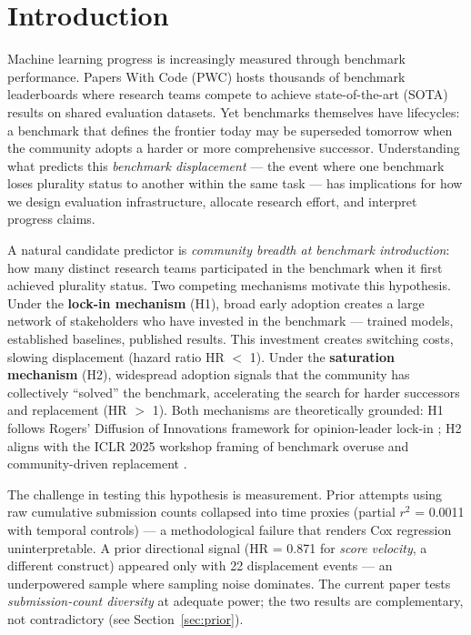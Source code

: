 \section{Introduction}

Machine learning progress is increasingly measured through benchmark performance. Papers With Code (PWC) hosts thousands of benchmark leaderboards where research teams compete to achieve state-of-the-art (SOTA) results on shared evaluation datasets. Yet benchmarks themselves have lifecycles: a benchmark that defines the frontier today may be superseded tomorrow when the community adopts a harder or more comprehensive successor. Understanding what predicts this \emph{benchmark displacement} --- the event where one benchmark loses plurality status to another within the same task --- has implications for how we design evaluation infrastructure, allocate research effort, and interpret progress claims.

A natural candidate predictor is \emph{community breadth at benchmark introduction}: how many distinct research teams participated in the benchmark when it first achieved plurality status. Two competing mechanisms motivate this hypothesis. Under the \textbf{lock-in mechanism} (H1), broad early adoption creates a large network of stakeholders who have invested in the benchmark --- trained models, established baselines, published results. This investment creates switching costs, slowing displacement (hazard ratio HR $<$ 1). Under the \textbf{saturation mechanism} (H2), widespread adoption signals that the community has collectively ``solved'' the benchmark, accelerating the search for harder successors and replacement (HR $>$ 1). Both mechanisms are theoretically grounded: H1 follows Rogers' Diffusion of Innovations framework for opinion-leader lock-in \cite{rogers2003diffusion}; H2 aligns with the ICLR 2025 workshop framing of benchmark overuse and community-driven replacement \cite{iclr2025benchmarking}.

The challenge in testing this hypothesis is measurement. Prior attempts using raw cumulative submission counts collapsed into time proxies (partial $r^{2}$ = 0.0011 with temporal controls) --- a methodological failure that renders Cox regression uninterpretable. A prior directional signal (HR = 0.871 for \emph{score velocity}, a different construct) appeared only with 22 displacement events --- an underpowered sample where sampling noise dominates. The current paper tests \emph{submission-count diversity} at adequate power; the two results are complementary, not contradictory (see Section~\ref{sec:prior}).


